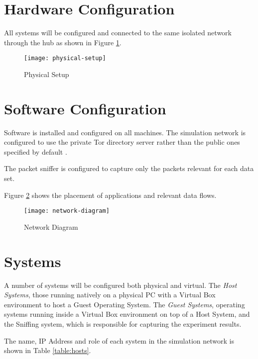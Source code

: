 \section{Hardware Configuration}

All systems will be configured and connected to the same isolated network
through the hub as shown in Figure \ref{physical-setup}.

\begin{figure}[H]
  \centering\texttt{[image: physical-setup]}
  \caption{Physical Setup}
  \label{physical-setup}
\end{figure}

\section{Software Configuration}

Software is installed and configured on all machines. The simulation network is
configured to use the private Tor directory server rather than the public ones
specified by default \parencite{website:private-tor-network}.

The packet sniffer is configured to capture only the packets relevant for each
data set.

Figure \ref{network-diagram} shows the placement of applications and relevant
data flows.

\begin{figure}[H]
  \centering\texttt{[image: network-diagram]}
  \caption{Network Diagram}
  \label{network-diagram}
\end{figure}

\section{Systems}

A number of systems will be configured both physical and virtual. The \emph{Host Systems}, those running natively on a physical PC with a Virtual Box environment to host a Guest Operating System. The \emph{Guest Systems}, operating systems running inside a Virtual Box environment on top of a Host System, and the Sniffing system, which is responsible for capturing the experiment results.

The name, IP Address and role of each system in the simulation network is shown in Table \ref{table:hosts}.

